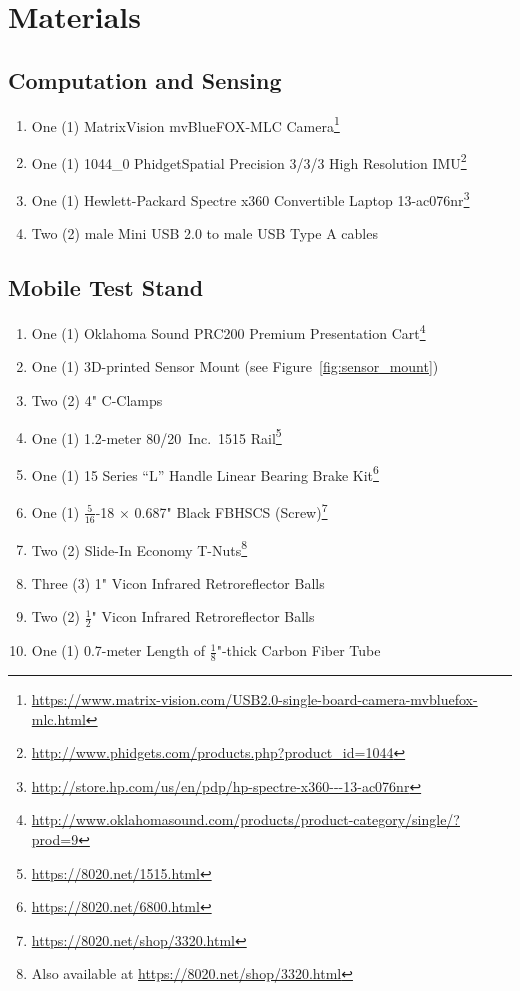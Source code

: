 \section{Materials}
\subsection{Computation and Sensing}
\begin{enumerate}
\item One (1) MatrixVision mvBlueFOX-MLC Camera\footnote{\url{https://www.matrix-vision.com/USB2.0-single-board-camera-mvbluefox-mlc.html}}
\item One (1) 1044\_0 PhidgetSpatial Precision 3/3/3 High Resolution IMU\footnote{\url{http://www.phidgets.com/products.php?product_id=1044}}
\item One (1) Hewlett-Packard Spectre x360 Convertible Laptop 13-ac076nr\footnote{\url{http://store.hp.com/us/en/pdp/hp-spectre-x360---13-ac076nr}}
\item Two (2) male Mini USB 2.0 to male USB Type A cables
\end{enumerate}

\subsection{Mobile Test Stand}
\begin{enumerate}
\item One (1) Oklahoma Sound PRC200 Premium Presentation Cart\footnote{\url{http://www.oklahomasound.com/products/product-category/single/?prod=9}}
\item One (1) 3D-printed Sensor Mount (see Figure~\ref{fig:sensor_mount})
\item Two (2) 4" C-Clamps
\item One (1) 1.2-meter 80/20\textsuperscript{\textregistered}~Inc.\ 1515 Rail\footnote{\url{https://8020.net/1515.html}}
\item One (1) 15 Series ``L'' Handle Linear Bearing Brake Kit\footnote{\url{https://8020.net/6800.html}}
\item One (1) $\frac{5}{16}$-18 $\times$ 0.687" Black FBHSCS (Screw)\footnote{\url{https://8020.net/shop/3320.html}}
\item Two (2) Slide-In Economy T-Nuts\footnote{Also available at \url{https://8020.net/shop/3320.html}}
\item Three (3) 1" Vicon Infrared Retroreflector Balls
\item Two (2) $\frac{1}{2}$" Vicon Infrared Retroreflector Balls
\item One (1) 0.7-meter Length of $\frac{1}{8}$"-thick Carbon Fiber Tube
\end{enumerate}

